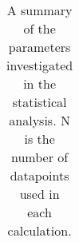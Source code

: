 \begin{table}
\begin{center}
\begin{tabular}{@{}llrrrr@{}}

\hline
\end{tabular}
\end{center}


\caption
{\label{tab_statistics}
A summary of the parameters investigated in the statistical analysis.  N is the
number of datapoints used in each calculation.}


\end{table}

